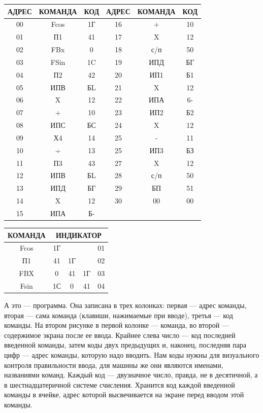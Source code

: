 \documentclass[11pt,a4paper,oneside]{article}
\begin{document}
\begin{tabular}{|c|c|c|c|c|c|}\hline
АДРЕС & КОМАНДА & КОД & АДРЕС & КОМАНДА & КОД \\\hline
00 & Fcos & 1Г & 16 & + & 10 \\\hline
01 & П1 & 41 & 17 & X & 12 \\\hline
02 & FBx & 0 & 18 & с/п & 50 \\\hline
03 & FSin & 1C & 19 & ИПД & БГ \\\hline
04 & П2 & 42 & 20 & ИП1 & Б1 \\\hline
05 & ИПВ & БL & 21 & X & 12 \\\hline
06 & X & 12 & 22 & ИПА & 6- \\\hline
07 & + & 10 & 23 & ИП2 & Б2 \\\hline
08 & ИПС & БС & 24 & X & 12 \\\hline
09 & Х4 & 14 & 25 & - & 11 \\\hline
10 & ÷ & 13 & 25 & ИП3 & БЗ \\\hline
11 & П3 & 43 & 27 & X & 12 \\\hline
12 & ИПВ & БL & 28 & с/п & 50 \\\hline
13 & ИПД & БГ & 29 & БП & 51 \\\hline
14 & X & 12 & 30 & 00 & 00 \\\hline
15 & ИПА & Б- & & & \\\hline
\end{tabular}

\begin{tabular}{|c|c|c|c|c|}\hline
КОМАНДА & \multicolumn{4}{|c|}{ИНДИКАТОР} \\\hline
Fcos & 1Г & & & 01 \\
П1 & 41 & 1Г & & 02 \\
FBX & 0 & 41 & 1Г & 03 \\
Fsin & 1С & 0 & 41 & 04 \\\hline
\end{tabular}

А это — программа. Она записана в трех колонках: первая — ад­рес команды, вторая — сама коман­да (клавиши, нажимаемые при вво­де), третья — код команды. На втором рисунке в первой колонке — команда, во второй — содержимое экрана после ее ввода. Крайнее сле­ва число — код последней введен­ной команды, затем коды двух пре­дыдущих и, наконец, последняя пара цифр — адрес команды, которую на­до вводить. Нам коды нужны для визуального контроля правильности ввода, для машины же они являются именами, названиями команд. Каж­дый код — двузначное число, прав­да, не в десятичной, а в шестнадца­теричной системе счисления. Хранит­ся код каждой введенной команды в ячейке, адрес которой высвечивается на экране перед вводом этой команды.
\end{document}
